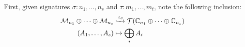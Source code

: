 
First, given signatures $\sigma: n_1, \ldots, n_s$ and $\tau:m_1, \ldots, m_t$,  note the following inclusion:
\begin{equation*}
  \begin{split}
\mathcal{M}_{n_1} \oplus \cdots \oplus \mathcal{M}_{n_s} 
& \xhookrightarrow{\iota_\sigma} 
\mathcal{T}(\mathbb{C}_{n_1} \oplus \cdots \oplus \mathbb{C}_{n_s})
\quad  \\
(A_1, \ldots, A_s) &\mapsto \bigoplus_i A_i  
  \end{split}
\end{equation*}

